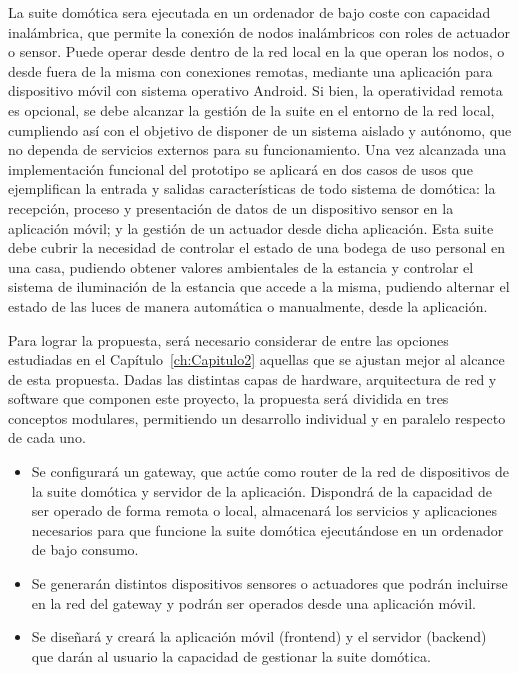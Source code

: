 \vspace{1cm}

La suite domótica sera ejecutada en un ordenador de bajo coste con capacidad inalámbrica, que permite la conexión de nodos inalámbricos con roles de actuador o sensor. Puede operar desde dentro de la red local en la que operan los nodos, o desde fuera de la misma con conexiones remotas, mediante una aplicación para dispositivo móvil con sistema operativo Android. Si bien, la operatividad remota es opcional, se debe alcanzar la gestión de la suite en el entorno de la red local, cumpliendo así con el objetivo de disponer de un sistema aislado y autónomo, que no dependa de servicios externos para su funcionamiento. Una vez alcanzada una implementación funcional del prototipo se aplicará en dos casos de usos que ejemplifican la entrada y salidas características de todo sistema de domótica: la recepción, proceso y presentación de datos de un dispositivo sensor en la aplicación móvil; y la gestión de un actuador desde dicha aplicación. Esta suite debe cubrir la necesidad de controlar el estado de una bodega de uso personal en una casa, pudiendo obtener valores ambientales de la estancia y controlar el sistema de iluminación de la estancia que accede a la misma, pudiendo alternar el estado de las luces de manera automática o manualmente, desde la aplicación.

\vspace{1cm}

Para lograr la propuesta, será necesario considerar de entre las opciones estudiadas en el Capítulo~\ref{ch:Capitulo2} aquellas que se ajustan mejor al alcance de esta propuesta. Dadas las distintas capas de hardware, arquitectura de red y software que componen este proyecto, la propuesta será dividida en tres conceptos modulares, permitiendo un desarrollo individual y en paralelo respecto de cada uno.

\begin{itemize}

\item Se configurará un gateway, que actúe como router de la red de dispositivos de la suite domótica y servidor de la aplicación. Dispondrá de la capacidad de ser operado de forma remota o local, almacenará los servicios y aplicaciones necesarios para que funcione la suite domótica ejecutándose en un ordenador de bajo consumo.

\item Se generarán distintos dispositivos sensores o actuadores que podrán incluirse en la red del \gls{gateway} y podrán ser operados desde una aplicación móvil.

\item Se diseñará y creará la aplicación móvil (frontend) y el servidor (backend) que darán al usuario la capacidad de gestionar la suite domótica.

\end{itemize}

